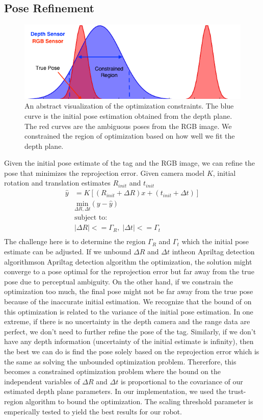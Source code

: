 \subsection{Pose Refinement}
\begin{figure}
\centering
\includegraphics[width=\columnwidth]{figs/optimization_visualization_fig}
\caption{An abstract visualization of the optimization constraints. The blue curve is the initial pose estimation obtained from the depth plane. The red curves are the ambiguous poses from the RGB image. We constrained the region of optimization based on how well we fit the depth plane.}
\label{fig:calib}
\end{figure}
Given the initial pose estimate of the tag and the RGB image, we can refine the pose that minimizes the reprojection error. Given camera model $K$, initial rotation and translation estimates $R_{init}$ and $t_{init}$
\begin{align*}
\hat{y} &= K[(R_{init} + \Delta R)x + (t_{init} + \Delta t)]\\
&\underset{\Delta R, \Delta t}{\mathrm{min}} (y - \hat{y})\\
&\text{subject to:} \\
& |\Delta R| <= \Gamma_R, \; |\Delta t| <= \Gamma_t\\
\end{align*}
The challenge here is to determine the region $\Gamma_R$ and $\Gamma_t$ which the initial pose estimate can be adjusted. If we unbound $\Delta R$ and $\Delta t$ intheon Apriltag detection algorithmson Apriltag detection algorithm the optimization, the solution might converge to a pose optimal for the reprojection error but far away from the true pose due to perceptual ambiguity. On the other hand, if we constrain the optimization too much, the final pose might not be far away from the true pose because of the inaccurate initial estimation. We recognize that the bound of on this optimization is related to the variance of the initial pose estimation. In one extreme, if there is no uncertainty in the depth camera and the range data are perfect, we don't need to further refine the pose of the tag. Similarly, if we don't have any depth information (uncertainty of the initial estimate is infinity), then the best we can do is find the pose solely based on the reprojection error which is the same as solving the unbounded optimization problem. Thererfore, this becomes a constrained optimization problem where the bound on the independent variables of $\Delta R$ and $\Delta t$ is proportional to the covariance of our estimated depth plane parameters. In our implementation, we used the trust-region algorithm to bound the optimization. The scaling threshold parameter is emperically tested to yield the best results for our robot. 